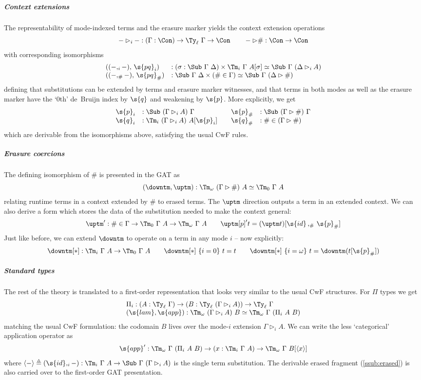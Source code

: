 \documentclass[a4paper,UKenglish,cleveref,autoref,thm-restate]{lipics-v2021}
\begin{document}
\subparagraph{Context extensions}
The representability of mode-indexed terms and the erasure marker yields
the context extension operations
\[-\rhd_{i}- : (\Gamma : \Con) \to \Ty_\ell\ \Gamma \to \Con \qquad
-\rhd \# : \Con \to \Con\]
with corresponding isomorphisms
\[\begin{array}{ll}
((-,_i-),\, \s{pq}_i) &: (\sigma : \Sub\ \Gamma\ \Delta) \times \Tm_i\ \Gamma\ A[\sigma] \simeq \Sub\ \Gamma\ (\Delta \rhd_i A) \\
((-,_\#-),\, \s{pq}_\#) &: \Sub\ \Gamma\ \Delta \times (\# \in \Gamma) \simeq
\Sub\ \Gamma\ (\Delta \rhd \#) \end{array}\] defining that substitutions can be
extended by terms and erasure marker witnesses, and that terms in both modes as well
as the erasure marker have the `0th' de~Bruijn index by $\s{q}$ and weakening
by $\s{p}$. More explicitly, we get
\[\begin{array}{ll@{\qquad}ll}
\s{p}_i &: \Sub\ (\Gamma \rhd_i A)\ \Gamma &
\s{p}_\# &: \Sub\ (\Gamma \rhd \#)\ \Gamma \\
\s{q}_i &: \Tm_i\ (\Gamma \rhd_i A)\ A [\s{p}_i] &
\s{q}_\# &: \# \in (\Gamma \rhd \#)
\end{array}
\]
which are derivable from the isomorphisms above, satisfying the usual CwF rules.


\subparagraph{Erasure coercions}

The defining isomorphism of $\#$ is presented in the GAT as
\[(\downtm, \uptm) : \Tm_\omega\ (\Gamma \rhd \#)\ A \simeq \Tm_0\ \Gamma\ A\]
relating runtime terms in a context extended by $\#$ to erased terms. The
$\uptm$ direction outputs a term in an extended context. We can also derive
a form which stores the data of the substitution needed to make the context general:
\[{\uptm'} : \# \in \Gamma \to \Tm_0\ \Gamma\ A \to \Tm_\omega\ \Gamma\ A \qquad
{\uptm[p]'} t = (\uptm t)[\s{id} \, ,_\# \, \s{p}_\#]\]
Just like before, we can extend $\downtm$ to operate on a term in any mode $i$ -- now explicitly:
\[{\downtm[*]} : \Tm_i\ \Gamma\ A \to \Tm_0\ \Gamma\ A \qquad
{\downtm[*]}\ \{i=0\}\ t = t \qquad
{\downtm[*]}\ \{i=\omega\}\ t = {\downtm} (t[\s{p}_\#])\]


\subparagraph{Standard types}

The rest of the theory is translated to a first-order representation that looks
very similar to the usual CwF structures. For $\Pi$ types we get
\[\begin{array}{ll}
  \Pi_i : (A : \Ty_\ell\ \Gamma) \to (B : \Ty_\ell\ (\Gamma \rhd_i A)) \to \Ty_\ell\ \Gamma \\
  (\s{lam},\s{app}) : \Tm_\omega\ (\Gamma \rhd_i A)\ B
\simeq \Tm_\omega\ \Gamma\ (\Pi_i\ A\ B) \end{array}\]
matching the usual CwF formulation: the codomain $B$ lives over the
mode-$i$ extension $\Gamma \rhd_i A$. We can write the less `categorical'
application operator as
\[\s{app}' : \Tm_\omega\ \Gamma\ (\Pi_i\ A\ B) \to (x : \Tm_i\ \Gamma\ A) \to
\Tm_\omega\ \Gamma\ B[\langle x \rangle]\] where $\langle-\rangle
\triangleq (\s{id},_i -) : \Tm_i\ \Gamma\ A \to \Sub\ \Gamma\ (\Gamma \rhd_i A)$
is the single term substitution. The derivable erased fragment
(\cref{ssub:erased}) is also carried over to the first-order GAT presentation.
\end{document}
